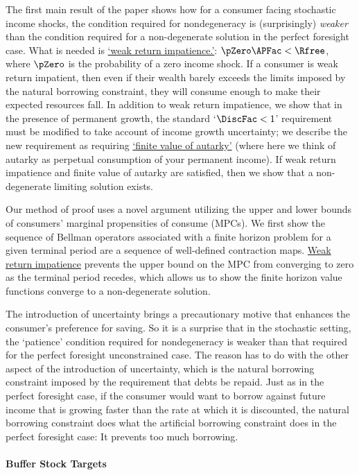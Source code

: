 \documentclass[BufferStockTheory]{subfiles}
\begin{document}
The first main result of the paper shows how for a consumer facing stochastic income shocks, the condition required for nondegeneracy is (surprisingly) \textit{weaker} than the condition required for a non-degenerate solution in the perfect foresight case. What is needed is \hyperlink{WRIC}{`weak return impatience.'}: $\pZero \APFac < \Rfree$, where $\pZero $ is the probability of a zero income shock. If a consumer is weak return impatient, then even if their wealth barely exceeds the limits imposed by the natural borrowing constraint, they will consume enough to make their expected resources fall.
In addition to weak return impatience, we show that in the presence of permanent growth, the standard `$\DiscFac<1$' requirement must be modified to take account of income growth uncertainty; we describe the new requirement as requiring \hyperlink{FVAC}{`finite value of autarky'} (where here we think of autarky as perpetual consumption of your permanent income).
If weak return impatience and finite value of autarky are satisfied, then we show that a non-degenerate limiting solution exists.

Our method of proof uses a novel argument utilizing the upper and lower bounds of consumers' marginal propensities of consume (MPCs). We first show the sequence of Bellman operators associated with a finite horizon problem for a given terminal period are a sequence of well-defined contraction maps.  \hyperlink{WRIC}{Weak return impatience} prevents the upper bound on the MPC from converging to zero as the terminal period recedes, which allows us to show the finite horizon value functions converge to a non-degenerate solution.


The introduction of uncertainty brings a precautionary motive that enhances the consumer's preference for saving.
So it is a surprise that in the stochastic setting, the `patience' condition required for nondegeneracy is weaker than that required for the perfect foresight unconstrained case.
The reason has to do with the other aspect of the introduction of uncertainty, which is the natural borrowing constraint imposed by the requirement that debts be repaid.
Just as in the perfect foresight case, if the consumer would want to borrow against future income that is growing faster than the rate at which it is discounted, the natural borrowing constraint does what the artificial borrowing constraint does in the perfect foresight case: It prevents too much borrowing.

\paragraph{Buffer Stock Targets}
\end{document}
